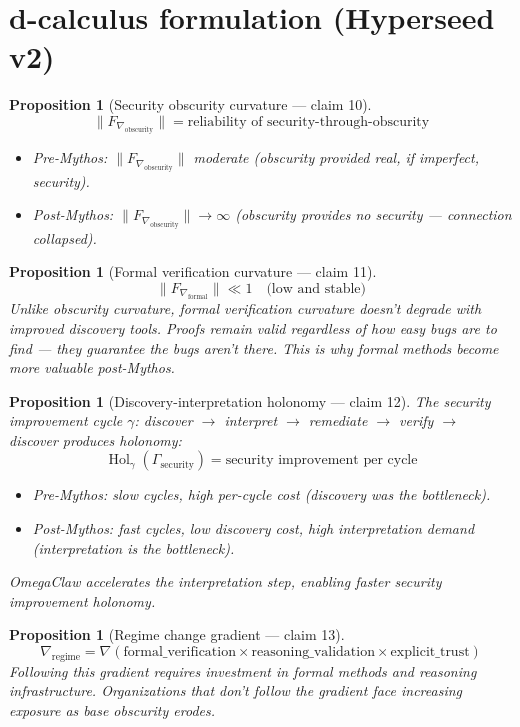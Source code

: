 \documentclass[11pt,a4paper]{article}
\newtheorem{proposition}[definition]{Proposition}
\begin{document}
\section{d-calculus formulation (Hyperseed v2)}

\begin{proposition}[Security obscurity curvature --- claim 10]
\label{prop:obscurity}
\[
  \|F_{\nabla_{\text{obscurity}}}\| = \text{reliability of
    security-through-obscurity}
\]
\begin{itemize}
  \item Pre-Mythos: $\|F_{\nabla_{\text{obscurity}}}\|$ moderate
    (obscurity provided real, if imperfect, security).
  \item Post-Mythos: $\|F_{\nabla_{\text{obscurity}}}\| \to \infty$
    (obscurity provides no security --- connection collapsed).
\end{itemize}
\end{proposition}

\begin{proposition}[Formal verification curvature --- claim 11]
\label{prop:formal}
\[
  \|F_{\nabla_{\text{formal}}}\| \ll 1 \quad \text{(low and stable)}
\]
Unlike obscurity curvature, formal verification curvature doesn't
degrade with improved discovery tools. Proofs remain valid regardless
of how easy bugs are to find --- they guarantee the bugs aren't there.
This is why formal methods become \emph{more} valuable post-Mythos.
\end{proposition}

\begin{proposition}[Discovery-interpretation holonomy --- claim 12]
\label{prop:holonomy}
The security improvement cycle $\gamma$: discover $\to$ interpret $\to$
remediate $\to$ verify $\to$ discover produces holonomy:
\[
  \operatorname{Hol}_\gamma(\Gamma_{\text{security}}) =
    \text{security improvement per cycle}
\]
\begin{itemize}
  \item Pre-Mythos: slow cycles, high per-cycle cost (discovery was
    the bottleneck).
  \item Post-Mythos: fast cycles, low discovery cost, high interpretation
    demand (interpretation is the bottleneck).
\end{itemize}
OmegaClaw accelerates the interpretation step, enabling faster security
improvement holonomy.
\end{proposition}

\begin{proposition}[Regime change gradient --- claim 13]
\label{prop:gradient}
\[
  \nabla_{\text{regime}} = \nabla\left(\text{formal\_verification} \times
    \text{reasoning\_validation} \times \text{explicit\_trust}\right)
\]
Following this gradient requires investment in formal methods and
reasoning infrastructure. Organizations that don't follow the gradient
face increasing exposure as base obscurity erodes.
\end{proposition}
\end{document}
